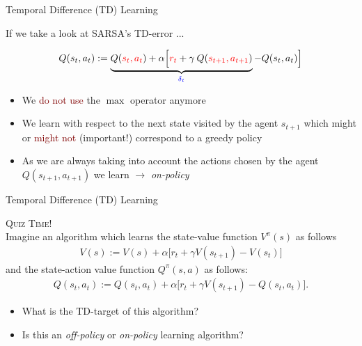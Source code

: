 \documentclass{beamer}
\newenvironment{takeaway}[1]{%
	\definecolor{shadecolor}{gray}{0.9}%
		\begin{shaded}{\color{skymagenta}\noindent\textsc{#1}}\\%
		}{%
		\end{shaded}%
}
\begin{document}
\begin{frame}{Temporal Difference (TD) Learning}

		If we take a look at SARSA's TD-error ...

		\begin{align*}
			Q(s_t,a_t):=\underbrace{Q(\textcolor{red}{s_t,a_t}) + \alpha\Big[\textcolor{red}{r_t} + \gamma \: Q(\textcolor{red}{s_{t+1},a_{t+1}})}_{\textcolor{blue}{\delta_t}} - Q(s_t, a_t) \Big]
		\end{align*}


		\begin{itemize}
			\item We \textcolor{Maroon}{do not use} the $\max$ operator anymore
			\item We learn with respect to the next state visited by the agent $s_{t+1}$ which might or \textcolor{Maroon}{might not} (important!) correspond to a greedy policy
			\item As we are always taking into account the actions chosen by the agent $Q(s_{t+1}, a_{t+1})$ we learn $\rightarrow$ \textit{on-policy}
		\end{itemize}

\end{frame}



\begin{frame}{Temporal Difference (TD) Learning}
	
	\begin{takeaway}{Quiz Time!}
		Imagine an algorithm which learns the state-value function $V^{\pi}(s)$ as follows 
		\begin{align*}
			V(s):= V(s) + \alpha \big[r_{t} + \gamma V(s_{t+1}) - V(s_t) \big]
		\end{align*}
		and the state-action value function $Q^{\pi}(s,a)$ as follows:
		\begin{align*}
			Q(s_{t}, a_{t}):= Q(s_{t}, a_{t}) + \alpha \big[r_{t} + \gamma V(s_{t+1}) - Q(s_{t}, a_{t}) \big].
		\end{align*}
	\end{takeaway}

	\begin{itemize}
		\item What is the TD-target of this algorithm?
		\item Is this an \textit{off-policy} or \textit{on-policy} learning algorithm?
	\end{itemize}

\end{frame}
\end{document}
